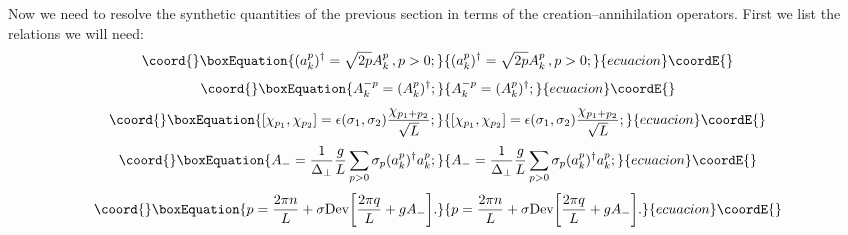 \documentclass[a4paper,12pt]{article}
\begin{document}
Now we need to resolve the synthetic quantities of the previous section in terms of 
the creation--annihilation operators. First we list the relations we will need:
\begin{equation}\coord{}\boxEquation{
\label{creation}
(a^p_k)^\dagger = \sqrt{2p}A^p_k\,, p>0;
}{
(a^p_k)^\dagger = \sqrt{2p}A^p_k\,, p>0;
}{ecuacion}\coordE{}\end{equation}
\begin{equation}\coord{}\boxEquation{
\label{conjugation}
A^{-p}_k = (A^p_k)^\dagger;
}{
A^{-p}_k = (A^p_k)^\dagger;
}{ecuacion}\coordE{}\end{equation}
\begin{equation}\coord{}\boxEquation{
\label{commutator}
[\chi_{p_1},\chi_{p_2}]=\epsilon(\sigma_1,\sigma_2)
\frac{\chi_{p_1+p_2}}{\sqrt{L}};
}{
[\chi_{p_1},\chi_{p_2}]=\epsilon(\sigma_1,\sigma_2)
\frac{\chi_{p_1+p_2}}{\sqrt{L}};
}{ecuacion}\coordE{}\end{equation}
\begin{equation}\coord{}\boxEquation{
\label{aminus}
A_- = \frac{1}{\Delta_\perp}\frac{g}{L}\sum_{p>0}
\sigma_p(a^p_k)^\dagger a^p_k;
}{
A_- = \frac{1}{\Delta_\perp}\frac{g}{L}\sum_{p>0}
\sigma_p(a^p_k)^\dagger a^p_k;
}{ecuacion}\coordE{}\end{equation}
\begin{equation}\coord{}\boxEquation{
\label{p}
p=\frac{2\pi n}{L} + \sigma 
{\rm Dev} \bigg[\frac{2\pi q}{L} + gA_- \bigg].
}{
p=\frac{2\pi n}{L} + \sigma 
{\rm Dev} \bigg[\frac{2\pi q}{L} + gA_- \bigg].
}{ecuacion}\coordE{}\end{equation}
\end{document}
